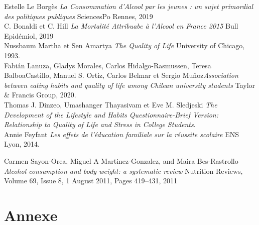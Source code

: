 \documentclass{article}
\begin{document}
\begin{thebibliography}{99}
\normalsize

 Estelle Le Borgès \textit{La Consommation d'Alcool par les jeunes : un sujet primordial des politiques publiques} SciencesPo Rennes, 2019 \\


 C. Bonaldi et C. Hill \textit{La Mortalité Attribuabe à l'Alcool en France 2015} Bull Epidémiol, 2019 \\

 Nussbaum Martha  et Sen Amartya \textit{The Quality of Life } University of Chicago, 1993. \\

 Fabián Lanuza, Gladys Morales, Carlos Hidalgo-Rasmussen, Teresa BalboaCastillo, Manuel S. Ortiz, Carlos Belmar et Sergio Muñoz\textit{Association between eating habits and quality of
life among Chilean university students} Taylor \& Francis Group, 2020. \\

 Thomas J. Dinzeo, Umashanger Thayasivam et
Eve M. Sledjeski \textit{The Development of the Lifestyle and Habits
Questionnaire-Brief Version: Relationship to Quality
of Life and Stress in College Students}. \\

 Annie Feyfant \textit{Les effets de l’éducation familiale sur la réussite scolaire} ENS Lyon, 2014.

 Carmen Sayon-Orea, Miguel A Martinez-Gonzalez, and Maira Bes-Rastrollo \textit{Alcohol consumption and body weight: a systematic review}
Nutrition Reviews, Volume 69, Issue 8, 1 August 2011, Pages 419–431, 2011

\end{thebibliography}
\newpage
\section{Annexe}
\end{document}
